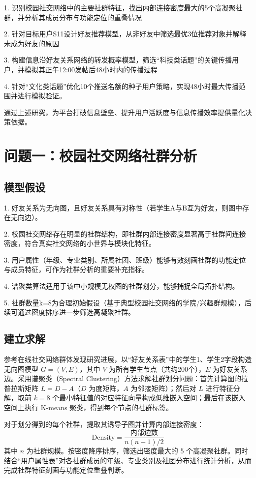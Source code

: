 \documentclass[a4paper,12pt]{ctexart}
\begin{document}
1. 识别校园社交网络中的主要社群特征，找出内部连接密度最大的5个高凝聚社群，并分析其成员分布与功能定位的重叠情况

2. 针对目标用户S11设计好友推荐模型，从非好友中筛选最优3位推荐对象并解释未成为好友的原因

3. 构建信息沿好友关系网络的转发概率模型，筛选“科技类话题”的关键传播用户，并模拟其正午12:00发帖后48小时内的传播过程

4. 针对“文化类话题”优化10个推送名额的种子用户策略，实现48小时最大传播范围并进行模拟验证。

通过上述研究，为平台打破信息壁垒、提升用户活跃度与信息传播效率提供量化决策依据。


\section{问题一：校园社交网络社群分析}
\subsection{模型假设}
1. 好友关系为无向图，且好友关系具有对称性（若学生A与B互为好友，则图中存在无向边）。

2. 校园社交网络存在明显的社群结构，即社群内部连接密度显著高于社群间连接密度，符合真实社交网络的小世界与模块化特征。

3. 用户属性（年级、专业类别、所属社团、班级）能够有效刻画社群的功能定位与成员特征，可作为社群分析的重要补充指标。

4. 谱聚类算法适用于该中小规模无权图的社群划分，能够捕捉全局拓扑结构。

5. 社群数量k=8为合理初始假设（基于典型校园社交网络的学院/兴趣群规模），后续可通过密度排序进一步筛选高凝聚社群。

\subsection{建立求解}
参考在线社交网络群体发现研究进展\cite{ref1}，以“好友关系表”中的学生1、学生2字段构造无向图模型 $G=(V,E)$，其中 $V$ 为所有学生节点（共约200个），$E$ 为好友关系边。采用谱聚类（Spectral Clustering）方法求解社群划分问题：首先计算图的拉普拉斯矩阵 $L = D - A$（$D$ 为度矩阵，$A$ 为邻接矩阵）；然后对 $L$ 进行特征分解，取前 $k=8$ 个最小特征值的对应特征向量构成低维嵌入空间；最后在该嵌入空间上执行 K-means 聚类，得到每个节点的社群标签。

对于划分得到的每个社群，提取其诱导子图并计算内部连接密度：
\begin{equation}
\text{Density} = \frac{\text{内部边数}}{n(n-1)/2}
\end{equation}
其中 $n$ 为社群规模。按密度降序排序，筛选出密度最大的 5 个高凝聚社群。同时结合“用户属性表”对各社群成员的年级、专业类别及社团分布进行统计分析，从而完成社群特征刻画与功能定位重叠判断。
\end{document}
